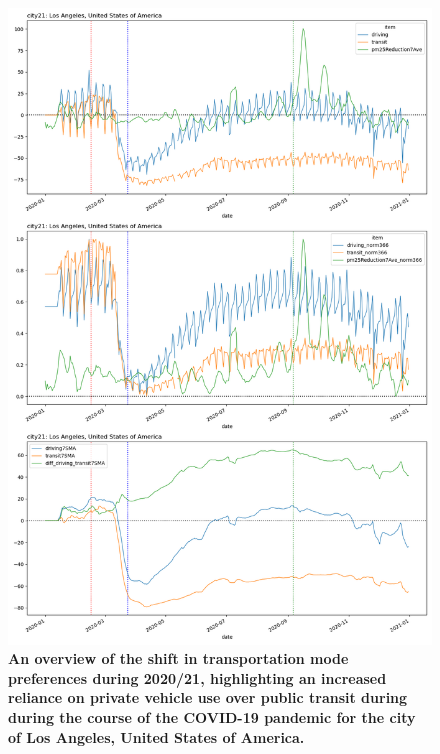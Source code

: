 \documentclass[preprint,12pt]{elsarticle}
\begin{document}
\begin{figure}
\centering
\includegraphics[trim={0 895 0 0},clip,scale=0.45]{Images/LA_Drive_trans.png}
\caption{\bf An overview of the shift in transportation mode preferences during 2020/21, highlighting an increased reliance on private vehicle use over public transit during during the course of the COVID-19 pandemic for the city of Los Angeles, United States of America.}  
 \label{fig:LAdriv_trans}
\end{figure}
\end{document}

